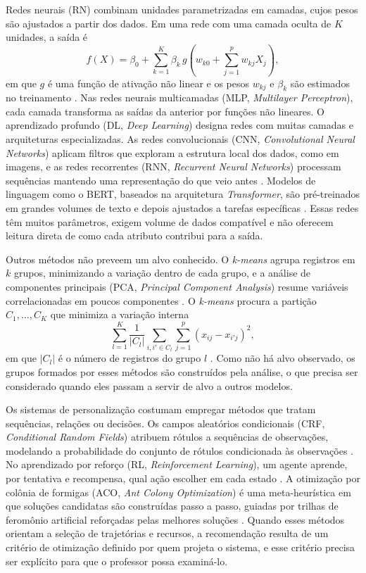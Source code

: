 Redes neurais (RN) combinam unidades parametrizadas em camadas, cujos pesos são ajustados a partir dos dados. Em uma rede com uma camada oculta de $K$ unidades, a saída é
\begin{equation}
f(X) = \beta_0 + \sum_{k=1}^{K} \beta_k \, g\!\left(w_{k0} + \sum_{j=1}^{p} w_{kj} X_j\right),
\label{eq:rede-neural}
\end{equation}
em que $g$ é uma função de ativação não linear e os pesos $w_{kj}$ e $\beta_k$ são estimados no treinamento \cite{James2021}. Nas redes neurais multicamadas (MLP, \textit{Multilayer Perceptron}), cada camada transforma as saídas da anterior por funções não lineares. O aprendizado profundo (DL, \textit{Deep Learning}) designa redes com muitas camadas e arquiteturas especializadas. As redes convolucionais (CNN, \textit{Convolutional Neural Networks}) aplicam filtros que exploram a estrutura local dos dados, como em imagens, e as redes recorrentes (RNN, \textit{Recurrent Neural Networks}) processam sequências mantendo uma representação do que veio antes \cite{James2021}. Modelos de linguagem como o BERT, baseados na arquitetura \textit{Transformer}, são pré-treinados em grandes volumes de texto e depois ajustados a tarefas específicas \cite{Devlin2019}. Essas redes têm muitos parâmetros, exigem volume de dados compatível e não oferecem leitura direta de como cada atributo contribui para a saída.

Outros métodos não preveem um alvo conhecido. O \textit{k-means} agrupa registros em $k$ grupos, minimizando a variação dentro de cada grupo, e a análise de componentes principais (PCA, \textit{Principal Component Analysis}) resume variáveis correlacionadas em poucos componentes \cite{James2021}. O \textit{k-means} procura a partição $C_1, \ldots, C_K$ que minimiza a variação interna
\begin{equation}
\sum_{l=1}^{K} \frac{1}{|C_l|} \sum_{i, i' \in C_l} \sum_{j=1}^{p} \left(x_{ij} - x_{i'j}\right)^2,
\label{eq:kmeans}
\end{equation}
em que $|C_l|$ é o número de registros do grupo $l$ \cite{James2021}. Como não há alvo observado, os grupos formados por esses métodos são construídos pela análise, o que precisa ser considerado quando eles passam a servir de alvo a outros modelos.

Os sistemas de personalização costumam empregar métodos que tratam sequências, relações ou decisões. Os campos aleatórios condicionais (CRF, \textit{Conditional Random Fields}) atribuem rótulos a sequências de observações, modelando a probabilidade do conjunto de rótulos condicionada às observações \cite{Lafferty2001}. No aprendizado por reforço (RL, \textit{Reinforcement Learning}), um agente aprende, por tentativa e recompensa, qual ação escolher em cada estado \cite{SuttonBarto2018}. A otimização por colônia de formigas (ACO, \textit{Ant Colony Optimization}) é uma meta-heurística em que soluções candidatas são construídas passo a passo, guiadas por trilhas de feromônio artificial reforçadas pelas melhores soluções \cite{DorigoStutzle2019}. Quando esses métodos orientam a seleção de trajetórias e recursos, a recomendação resulta de um critério de otimização definido por quem projeta o sistema, e esse critério precisa ser explícito para que o professor possa examiná-lo.

